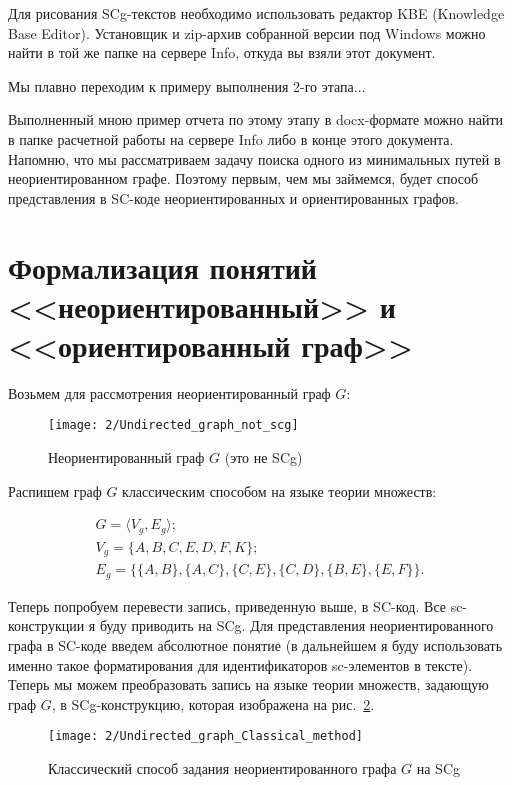 Для рисования SCg-текстов необходимо использовать редактор KBE
(Knowledge Base Editor). Установщик и zip-архив собранной версии под
Windows можно найти в той же папке на сервере Info, откуда вы взяли
этот документ.

Мы плавно переходим к примеру выполнения 2-го этапа$\dots$

Выполненный мною пример отчета по этому этапу в docx-формате можно
найти в папке расчетной работы на сервере Info либо в конце этого
документа.  Напомню, что мы рассматриваем задачу поиска одного из
минимальных путей в неориентированном графе. Поэтому первым, чем мы
займемся, будет способ представления в SC-коде неориентированных и
ориентированных графов.


\section{Формализация понятий <<неориентированный>> и
  <<ориентированный граф>>}
\label{sec:onto_form_undir_dir_graph}

Возьмем для рассмотрения неориентированный граф $G$:

\begin{figure}[h!]
  \centering
  \texttt{[image: 2/Undirected\_graph\_not\_scg]}
  \caption{Неориентированный граф $G$ (это не SCg)}
  \label{fig:Undirected_graph_not_scg}
\end{figure}

Распишем граф $G$ классическим способом на языке теории множеств:

\begin{gather}
  G = \langle V_g,E_g \rangle; \label{eq:Graph_G_classical} \\
  V_g = \{A,B,C,E,D,F,K\}; \nonumber \\
  E_g = \{\{A,B\},\{A,C\},\{C,E\},\{C,D\},\{B,E\},\{E,F\}\}. \nonumber
\end{gather}

Теперь попробуем перевести запись, приведенную выше, в SC-код. Все
sc-конструкции я буду приводить на SCg. Для представления
неориентированного графа в SC-коде введем абсолютное понятие
 (в дальнейшем я буду использовать именно
такое форматирования для идентификаторов sc-элементов в
тексте). Теперь мы можем преобразовать запись на языке теории
множеств, задающую граф $G$, в SCg-конструкцию, которая изображена на
рис.~\ref{fig:Undirected_graph_Classical_method}.

\begin{figure}[h!]
  \centering
  \texttt{[image: 2/Undirected\_graph\_Classical\_method]}
  \caption{Классический способ задания неориентированного графа $G$ на
    SCg}
  \label{fig:Undirected_graph_Classical_method}
\end{figure}

